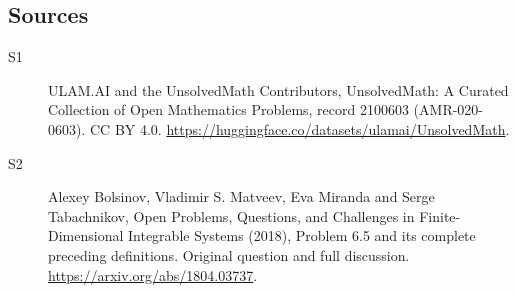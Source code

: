 \documentclass[11pt]{article}
\begin{document}
\subsection{Sources}
\begin{description}
\item[\hypertarget{source:2100603:1}{S1}] ULAM.AI and the UnsolvedMath Contributors, UnsolvedMath: A Curated Collection of Open Mathematics Problems, record 2100603 (AMR-020-0603). CC BY 4.0. \url{https://huggingface.co/datasets/ulamai/UnsolvedMath}.
\item[\hypertarget{source:2100603:2}{S2}] Alexey Bolsinov, Vladimir S. Matveev, Eva Miranda and Serge Tabachnikov, Open Problems, Questions, and Challenges in Finite-Dimensional Integrable Systems (2018), Problem 6.5 and its complete preceding definitions. Original question and full discussion. \url{https://arxiv.org/abs/1804.03737}.

\end{description}
\label{end:2100603}
\end{document}
